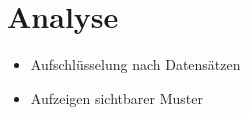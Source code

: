 \section{Analyse}\label{sec:analyse}

\begin{itemize}
    \item Aufschlüsselung nach Datensätzen
    \item Aufzeigen sichtbarer Muster
\end{itemize}